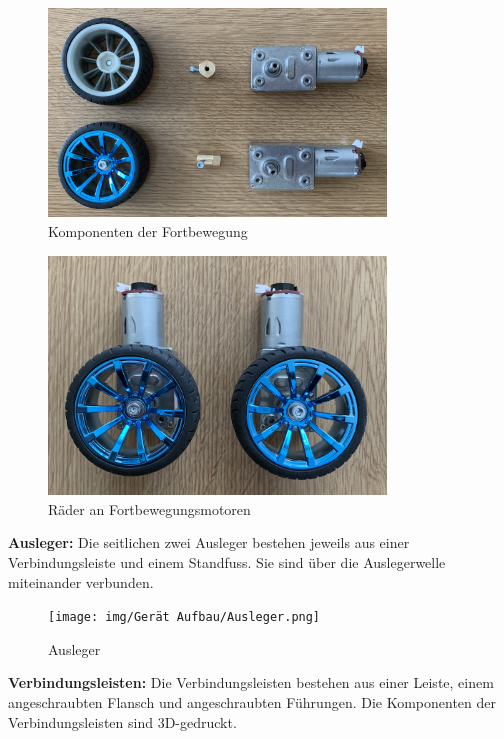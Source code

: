\begin{figure}[H]
  \includegraphics[width=0.8\textwidth]{img/Gerät Aufbau/Räder zerlegt.png}
  \centering
  \caption{Komponenten der Fortbewegung}
  \label{fig:Komponenten der Fortbewegung}
\end{figure}

\begin{figure}[H]
  \includegraphics[width=0.8\textwidth]{img/Gerät Aufbau/Räder mit Motor.png}
  \centering
  \caption{Räder an Fortbewegungsmotoren}
  \label{fig:Räder an Fortbewegungsmotoren}
\end{figure}

\newpage

\textbf{Ausleger:} Die seitlichen zwei Ausleger bestehen jeweils aus einer Verbindungsleiste und einem Standfuss. Sie sind über die Auslegerwelle miteinander verbunden.

\begin{figure}[H]
  \texttt{[image: img/Gerät Aufbau/Ausleger.png]}
  \centering
  \caption{Ausleger}
  \label{fig:Ausleger}
\end{figure}

\textbf{Verbindungsleisten:} Die Verbindungsleisten bestehen aus einer Leiste, einem angeschraubten Flansch und angeschraubten Führungen. Die Komponenten der Verbindungsleisten sind 3D-gedruckt.

